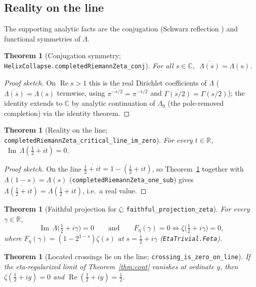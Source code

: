 \documentclass[11pt]{article}
\newtheorem{theorem}[definition]{Theorem}
\DeclareMathOperator{\Ree}{Re}
\DeclareMathOperator{\Imm}{Im}
\newcommand{\C}{\mathbb{C}}
\newcommand{\R}{\mathbb{R}}
\newcommand{\conj}[1]{\overline{#1}}
\newcommand{\code}[1]{\texttt{#1}}
\begin{document}
\subsection{Reality on the line}\label{sub:reality}

The supporting analytic facts are the conjugation (Schwarz reflection \cite{Ahlfors1979}) and
functional symmetries of $\Lambda$.

\begin{theorem}[Conjugation symmetry; \code{HelixCollapse.completedRiemannZeta\_conj}]\label{thm:conj}
For all $s\in\C$, $\;\conj{\Lambda(\conj s)}=\Lambda(s)$.
\end{theorem}

\begin{proof}[Proof sketch]
On $\Ree s>1$ this is the real Dirichlet coefficients of $\Lambda$ ($\conj{\Lambda(\conj s)}=\Lambda(s)$
termwise, using $\conj{\pi^{-s/2}}=\pi^{-\conj s/2}$ and $\conj{\Gamma(\conj{s}/2)}=\Gamma(s/2)$); the
identity extends to $\C$ by analytic continuation of $\Lambda_0$ (the pole-removed completion) via the
identity theorem.
\end{proof}

\begin{theorem}[Reality on the line; \code{completedRiemannZeta\_critical\_line\_im\_zero}]\label{thm:real}
For every $t\in\R$, $\;\Imm\,\Lambda(\tfrac12+it)=0$.
\end{theorem}

\begin{proof}[Proof sketch]
On the line $\conj{\tfrac12+it}=1-(\tfrac12+it)$, so Theorem~\ref{thm:conj} together with
$\Lambda(1-s)=\Lambda(s)$ (\code{completedRiemannZeta\_one\_sub}) gives
$\conj{\Lambda(\tfrac12+it)}=\Lambda(\tfrac12+it)$, i.e.\ a real value.
\end{proof}

\begin{theorem}[Faithful projection for $\zeta$; \code{faithful\_projection\_zeta}]\label{thm:faithproj}
For every $\gamma\in\R$,
\[
  \Imm\,\Lambda\!\bigl(\tfrac12+i\gamma\bigr)=0
  \qquad\text{and}\qquad
  F_\eta(\gamma)=0 \iff \zeta\!\bigl(\tfrac12+i\gamma\bigr)=0,
\]
where $F_\eta(\gamma)=(1-2^{1-s})\zeta(s)$ at $s=\tfrac12+i\gamma$ (\code{EtaTrivial.Feta}).
\end{theorem}

\begin{theorem}[Located crossings lie on the line; \code{crossing\_is\_zero\_on\_line}]\label{thm:located}
If the eta-regularized limit of Theorem~\ref{thm:cont} vanishes at ordinate $y$, then
$\zeta(\tfrac12+iy)=0$ and $\Ree(\tfrac12+iy)=\tfrac12$.
\end{theorem}
\end{document}
